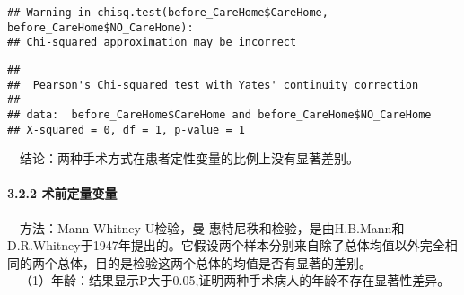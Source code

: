 \documentclass[
]{article}
\newenvironment{Shaded}{\begin{snugshade}}{\end{snugshade}}
\newcommand{\AttributeTok}[1]{\textcolor[rgb]{0.77,0.63,0.00}{#1}}
\newcommand{\FunctionTok}[1]{\textcolor[rgb]{0.00,0.00,0.00}{#1}}
\newcommand{\NormalTok}[1]{#1}
\newcommand{\OtherTok}[1]{\textcolor[rgb]{0.56,0.35,0.01}{#1}}
\newcommand{\SpecialCharTok}[1]{\textcolor[rgb]{0.00,0.00,0.00}{#1}}
\newcommand{\StringTok}[1]{\textcolor[rgb]{0.31,0.60,0.02}{#1}}
\begin{document}
\begin{Shaded}
\end{Shaded}

\begin{verbatim}
## Warning in chisq.test(before_CareHome$CareHome, before_CareHome$NO_CareHome):
## Chi-squared approximation may be incorrect
\end{verbatim}

\begin{verbatim}
## 
##  Pearson's Chi-squared test with Yates' continuity correction
## 
## data:  before_CareHome$CareHome and before_CareHome$NO_CareHome
## X-squared = 0, df = 1, p-value = 1
\end{verbatim}

 结论：两种手术方式在患者定性变量的比例上没有显著差别。

\hypertarget{ux672fux524dux5b9aux91cfux53d8ux91cf}{%
\paragraph{3.2.2
术前定量变量}\label{ux672fux524dux5b9aux91cfux53d8ux91cf}}

 方法：Mann-Whitney-U检验，曼-惠特尼秩和检验，是由H.B.Mann和D.R.Whitney于1947年提出的。它假设两个样本分别来自除了总体均值以外完全相同的两个总体，目的是检验这两个总体的均值是否有显著的差别。\\
 （1）年龄：结果显示P大于0.05,证明两种手术病人的年龄不存在显著性差异。
\end{document}
